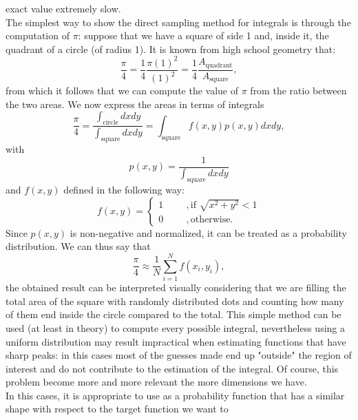 exact value extremely slow.\\
The simplest way to show the direct sampling method for integrals is through the computation of $\pi$: suppose that we have a square of side 1 and, inside it, 
the quadrant of a circle (of radius 1). It is known from high school geometry that:
\begin{equation}
    \frac{\pi}{4}=\frac{1}{4}\frac{\pi(1)^2}{(1)^2}=\frac{1}{4}\frac{A_{\text{quadrant}}}{A_{\text{square}}},
\end{equation}
from which it follows that we can compute the value of $\pi$ from the ratio between the two areas.
We now express the areas in terms of integrals
\begin{equation}
    \frac{\pi}{4}=\frac{\int_{\text{circle}}dxdy}{\int_{\text{square}}dxdy}=\int_{\text{square}}f(x,y)p(x,y)dxdy,
\end{equation}
with
\begin{equation}
    p(x,y)=\frac{1}{\int_{\text{square}}dxdy}
\end{equation}
and $f(x,y)$ defined in the following way:
\begin{equation}
    f(x,y)=
    \begin{cases}
    1\hspace{1cm},\text{if }\sqrt{x^2+y^2}<1\\
    0\hspace{1cm},\text{otherwise}.    
    \end{cases}
\end{equation}
Since $p(x,y)$ is non-negative and normalized, it can be treated as a probability distribution. We can thus say that
\begin{equation}
    \frac{\pi}{4}\approx \frac{1}{N}\sum_{i=1}^N f(x_i,y_i),
\end{equation}
the obtained result can be interpreted visually considering that we are filling the total area of the square with randomly distributed dots 
and counting how many of them end inside the circle compared to the total.
This simple method can be used (at least in theory) to compute every possible integral, nevertheless using a uniform distribution may 
result impractical when estimating functions that have sharp peaks: in this cases most of the guesses made end up "outside" the region of interest 
and do not contribute to the estimation of the integral. Of course, this problem become more and more relevant the more dimensions we have.\\
In this cases, it is appropriate to use as a probability function that has a similar shape with respect to the target function we want to 
